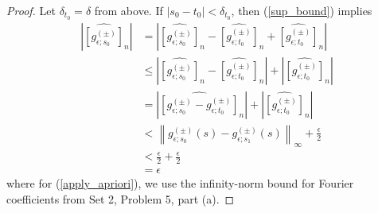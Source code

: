 \documentclass[12pt, reqno]{amsart}
\theoremstyle{definition}
\theoremstyle{remark}
\begin{document}
\begin{itemize}
\begin{itemize}
\begin{proof}
Let $\delta_{t_0}=\delta$ from above. If $|s_{0}-t_{0}|< \delta_{t_{0}}$, then (\ref{sup_bound}) implies
\begin{align}
\left|\widehat{[g^{(\pm)}_{\epsilon;s_{0}}]}_{n}\right|&= \left|\widehat{[g^{(\pm)}_{\epsilon;s_{0}}]}_{n}-\widehat{[g^{(\pm)}_{\epsilon;t_{0}}]}_{n}+\widehat{[g^{(\pm)}_{\epsilon;t_{0}}]}_{n}\right|\\
&\le \left|\widehat{[g^{(\pm)}_{\epsilon;s_{0}}]}_{n}-\widehat{[g^{(\pm)}_{\epsilon;t_{0}}]}_{n}\right|+\left|\widehat{[g^{(\pm)}_{\epsilon;t_{0}}]}_{n}\right|\\
&= \left|\widehat{[g^{(\pm)}_{\epsilon;s_{0}}-g^{(\pm)}_{\epsilon;t_{0}}]}_{n}\right|+\left|\widehat{[g^{(\pm)}_{\epsilon;t_{0}}]}_{n}\right|\\
&< \left\|g_{\epsilon;s_{0}}^{(\pm)}(s)-g^{(\pm)}_{\epsilon;s_{1}}(s)\right\|_{\infty}+ \frac{\epsilon}{2}\label{apply_apriori}\\
&< \frac{\epsilon}{2}+\frac{\epsilon}{2}\\
&= \epsilon
\end{align}
where for (\ref{apply_apriori}), we use the infinity-norm bound for Fourier coefficients from Set 2, Problem 5, part (a). 
\end{proof}



\end{itemize}





\end{itemize}
\end{document}
